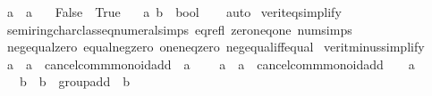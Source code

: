 \begin{isabellebody}
\ \ {\isacartoucheopen}{\isasymnot}{\isasymnot}a\ {\isasymlongleftrightarrow}\ a{\isacartoucheclose}\isanewline
\ \ {\isacartoucheopen}{\isacharparenleft}{\kern0pt}{\isasymnot}\ False{\isacharparenright}{\kern0pt}\ {\isacharequal}{\kern0pt}\ True{\isacartoucheclose}\isanewline
\ \ \ a\ b\ {\isacharcolon}{\kern0pt}{\isacharcolon}{\kern0pt}\ bool\isanewline
%
\isadelimproof
\ \ %
\endisadelimproof
%
\isatagproof
{}\isamarkupfalse%
\ auto%
\endisatagproof
{\isafoldproof}%
%
\isadelimproof
\isanewline
%
\endisadelimproof
\isanewline
{}\isamarkupfalse%
\ verit{\isacharunderscore}{\kern0pt}eq{\isacharunderscore}{\kern0pt}simplify\ {\isacharequal}{\kern0pt}\isanewline
\ \ semiring{\isacharunderscore}{\kern0pt}char{\isacharunderscore}{\kern0pt}{}{\isacharunderscore}{\kern0pt}class{\isachardot}{\kern0pt}eq{\isacharunderscore}{\kern0pt}numeral{\isacharunderscore}{\kern0pt}simps\ eq{\isacharunderscore}{\kern0pt}refl\ zero{\isacharunderscore}{\kern0pt}neq{\isacharunderscore}{\kern0pt}one\ num{\isachardot}{\kern0pt}simps\isanewline
\ \ neg{\isacharunderscore}{\kern0pt}equal{\isacharunderscore}{\kern0pt}zero\ equal{\isacharunderscore}{\kern0pt}neg{\isacharunderscore}{\kern0pt}zero\ one{\isacharunderscore}{\kern0pt}neq{\isacharunderscore}{\kern0pt}zero\ neg{\isacharunderscore}{\kern0pt}equal{\isacharunderscore}{\kern0pt}iff{\isacharunderscore}{\kern0pt}equal\isanewline
\isanewline
{}\isamarkupfalse%
\ verit{\isacharunderscore}{\kern0pt}minus{\isacharunderscore}{\kern0pt}simplify{\isacharcolon}{\kern0pt}\isanewline
\ \ {\isacartoucheopen}{\isacharparenleft}{\kern0pt}a\ {\isacharcolon}{\kern0pt}{\isacharcolon}{\kern0pt}\ {\isacharprime}{\kern0pt}a\ {\isacharcolon}{\kern0pt}{\isacharcolon}{\kern0pt}\ cancel{\isacharunderscore}{\kern0pt}comm{\isacharunderscore}{\kern0pt}monoid{\isacharunderscore}{\kern0pt}add{\isacharparenright}{\kern0pt}\ {\isacharminus}{\kern0pt}\ a\ {\isacharequal}{\kern0pt}\ {}{\isacartoucheclose}\isanewline
\ \ {\isacartoucheopen}{\isacharparenleft}{\kern0pt}a\ {\isacharcolon}{\kern0pt}{\isacharcolon}{\kern0pt}\ {\isacharprime}{\kern0pt}a\ {\isacharcolon}{\kern0pt}{\isacharcolon}{\kern0pt}\ cancel{\isacharunderscore}{\kern0pt}comm{\isacharunderscore}{\kern0pt}monoid{\isacharunderscore}{\kern0pt}add{\isacharparenright}{\kern0pt}\ {\isacharminus}{\kern0pt}\ {}\ {\isacharequal}{\kern0pt}\ a{\isacartoucheclose}\isanewline
\ \ {\isacartoucheopen}{}\ {\isacharminus}{\kern0pt}\ {\isacharparenleft}{\kern0pt}b\ {\isacharcolon}{\kern0pt}{\isacharcolon}{\kern0pt}\ {\isacharprime}{\kern0pt}b\ {\isacharcolon}{\kern0pt}{\isacharcolon}{\kern0pt}\ {\isacharbraceleft}{\kern0pt}group{\isacharunderscore}{\kern0pt}add{\isacharbraceright}{\kern0pt}{\isacharparenright}{\kern0pt}\ {\isacharequal}{\kern0pt}\ {\isacharminus}{\kern0pt}b{\isacartoucheclose}\isanewline

\end{isabellebody}
